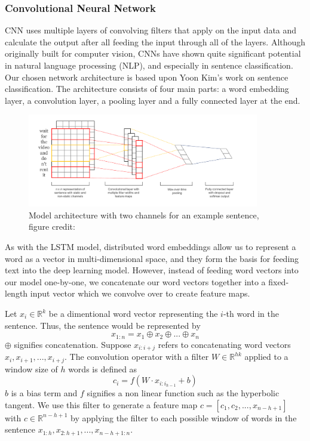 \documentclass[conference]{IEEEtran}
\begin{document}
\subsubsection{Convolutional Neural Network}
\label{model:back:cnn}
    CNN uses multiple layers of convolving filters that apply on the input data and
    calculate the output after all feeding the input through all of the layers. Although
    originally built for computer vision, CNNs have shown quite significant potential in
    natural language processing (NLP), and especially in sentence classification.
    Our chosen network architecture is based upon Yoon Kim's work on sentence
    classification\cite{kim2014convolutional}. The architecture consists of four 
    main parts: a word
    embedding layer, a convolution layer, a pooling layer and a fully connected layer
    at the end.
    \begin{figure}
    \center\includegraphics[width=0.9\textwidth]{figure/sc_model}
    \caption{Model architecture with two channels for an example sentence,
     figure credit: \cite{kim2014convolutional}}
    \end{figure}

    As with the LSTM model, distributed word embeddings allow us to represent a 
    word as a vector in multi-dimensional space, and they form the basis for feeding 
    text into the deep learning model. However, instead of feeding word vectors into
    our model one-by-one, we concatenate our word vectors together into a fixed-length
    input vector which we convolve over to create feature maps. 

    Let $x_{i} \in \mathbb{R}^k$ be a dimentional word vector representing the $i$-th word in the
    sentence. Thus, the sentence would be represented by
    \begin{equation}
    x_{1:n} = x_1 \oplus x_2 \oplus ... \oplus x_n
    \end{equation}
    $\oplus$ signifies concatenation. Suppose $x_{i:i+j}$ refers to concatenating
    word vectors $x_i, x_{i+1}, ... , x_{i+j}$. The convolution operator with a filter
    $W \in \mathbb{R}^{hk}$ applied to a window size of $h$
    words is defined as
    \begin{equation}
    c_i = f(W \cdot x_{i:i_{h-1}} + b)
    \end{equation}
    $b$ is a bias term and $f$ signifies a non linear function such as the hyperbolic
    tangent. We use this filter to generate a feature map $c = [c_1, c_2, ... ,x_{n-h+1}]$
    with $c \in \mathbb{R}^{n-h+1}$ by applying the filter to each possible window of words in
    the sentence $x_{1:h}, x_{2:h+1}, ... ,x_{n-h+1:n}$.
\end{document}
